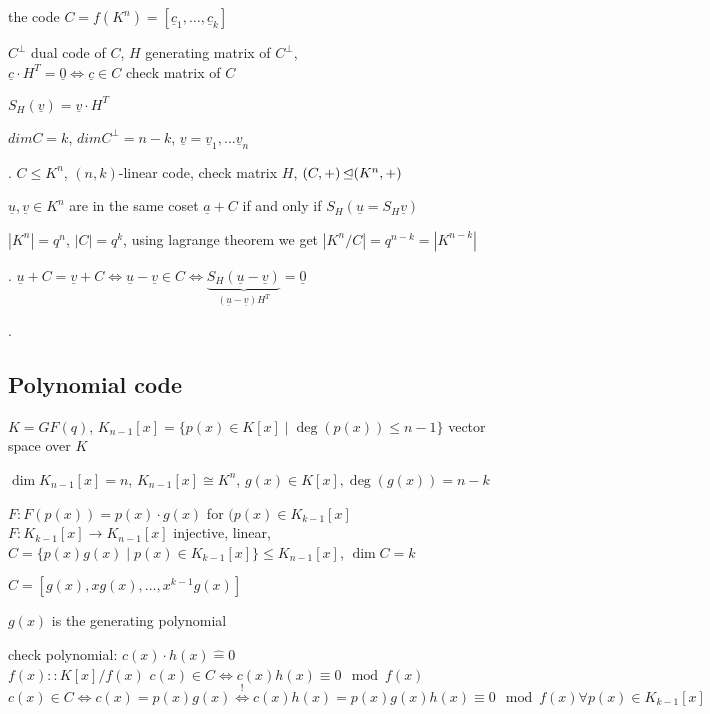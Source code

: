 the code $C = f(K^n) = [\underline{c}_1, \ldots, \underline{c}_k]$

$C^\bot$ dual code of $C$, $H$ generating matrix of $C^\bot$, \\
$\underline{c}\cdot H^T = \underline{0} \Leftrightarrow \underline{c} \in C$ check matrix of $C$

$S_H(\underline{v}) = \underline{v} \cdot H^T$

$dim C = k$, $dim C^\bot = n-k$, $\underline{v} = \underline{v}_1, \ldots \underline{v}_n$

\Theorem.
$C\leq K^n$, $(n,k)$-linear code, check matrix $H$, $(C,+) \operatorname{\trianglelefteq} (K^n, +)$

$\underline{u}, \underline{v} \in K^n$ are in the same coset $\underline{a} + C$ if and only if $S_H(\underline{u} = S_H\underline{v})$

$|K^n| = q^n$, $|C| = q^k$, using lagrange theorem we get $|K^n / C| = q^{n-k} = |K^{n-k}|$

\Proof. 
$\underline{u} + C = \underline{v} + C \Leftrightarrow \underline{u} - \underline{v} \in C \Leftrightarrow \underbrace{S_H(\underline{u}-\underline{v})}_{(\underline{u}-\underline{v}) H^T} = \underline{0}$


\Example.

\subsection{Polynomial code}
$K= GF(q)$, $K_{n-1}[x] = \{p(x) \in K[x] \mid \deg(p(x)) \leq n-1\}$ vector space over $K$

$\dim K_{n-1}[x] = n$, $K_{n-1}[x] \cong K^n$, $g(x) \in K[x], \deg(g(x)) = n-k$

$F: F(p(x)) = p(x) \cdot g(x)$ for $(p(x) \in K_{k-1}[x]$\\
$F: K_{k-1}[x] \rightarrow K_{n-1}[x]$ injective, linear, $C= \{p(x)g(x) \mid p(x) \in K_{k-1}[x]\} \leq K_{n-1}[x]$, $\dim C = k$

$C= [g(x), xg(x), \ldots, x^{k-1} g(x)]$

$g(x)$ is the generating polynomial

check polynomial: $c(x)\cdot h(x) \hat{=} 0$\\
$f(x):: K[x] / f(x)$ \quad $c(x) \in C \Leftrightarrow c(x)h(x) \equiv 0 \mod f(x)$\\
$c(x) \in C \Leftrightarrow c(x) = p(x)g(x) \stackrel{!}{\Leftrightarrow} c(x)h(x)=p(x)g(x)h(x) \equiv 0 \mod f(x) \forall p(x) \in K_{k-1}[x]$

